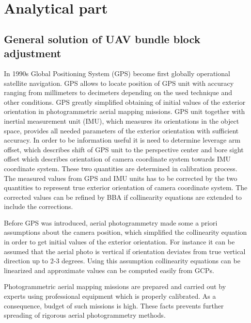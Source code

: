 \documentclass[a4paper,12pt]{article}
\begin{document}
\section{Analytical part}

\subsection{General solution of UAV bundle block adjustment}



In 1990s Global Positioning System (GPS) become first globally operational satellite navigation.
GPS allows 
to locate position of GPS unit with accuracy ranging  from  millimeters to decimeters depending 
on the used technique and other conditions. 
GPS greatly simplified obtaining of initial values of the exterior orientation in photogrammetric aerial mapping missions.
GPS unit together with 
inertial measurement unit (IMU), which measures its orientations in the object space,
provides all needed parameters of the exterior orientation with sufficient accuracy. In order to be information useful it is need to determine 
leverage arm offset, which describes shift of GPS unit to the perspective center and bore sight offset
which describes orientation of camera coordinate system towards IMU coordinate system. These two
quantities are determined in calibration process. The measured values from GPS and IMU units has to
be corrected by the two quantities to represent true exterior orientation of camera coordinate system. The corrected values 
can be refined by BBA if collinearity equations are extended to include the corrections.

Before GPS was introduced, aerial photogrammetry made some a priori assumptions about the camera position,
which simplified the collinearity equation in order to get initial values of the exterior orientation. 
For instance it can be assumed that the aerial photo is vertical if orientation deviates from true vertical
direction up to 2-3 degrees. Using this assumption collinearity equations can be linearized and 
approximate values can be computed easily from GCPs.


Photogrammetric aerial mapping missions are prepared and carried out by experts using 
professional equipment which is properly calibrated.
As a consequence, budget of such missions
is high. These facts prevents further spreading of rigorous aerial photogrammetry methods.
\end{document}
